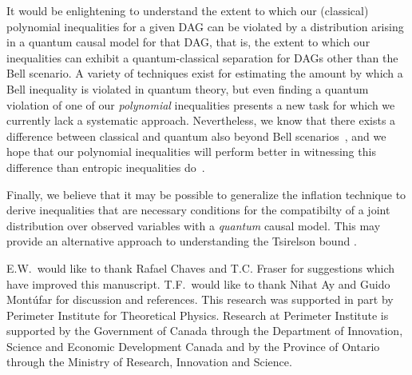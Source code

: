 {It would be enlightening to understand the extent to which our (classical) polynomial inequalities for a given DAG can be violated by a distribution arising in a quantum causal model for that DAG, that is, the extent to which our inequalities can exhibit  a quantum-classical separation for DAGs other than the Bell scenario.  A variety of techniques exist for estimating the amount by which a Bell inequality \cite{NPA2008Long,I3322NPA1} is violated in quantum theory, but even finding a quantum violation of one of our \emph{polynomial} inequalities presents a new task for which we currently lack a systematic approach. Nevertheless, we know that there exists a difference between classical and quantum also beyond Bell scenarios~\cite[Theorem~2.16]{fritz2012bell}, and we hope that our polynomial inequalities will perform better in witnessing this difference than entropic inequalities do~\cite{pusey2014gdag,Chaves2015infoquantum}.

Finally, we believe that it may be possible to generalize the inflation technique to derive inequalities that are necessary conditions for the compatibilty of a joint distribution over observed variables with a {\em quantum} causal model.  This may provide an alternative approach to understanding the Tsirelson bound \cite{Brunner2013Bell}.







\begin{acknowledgments}
E.W.~would like to thank Rafael Chaves and T.C. Fraser for suggestions which have improved this manuscript. T.F.~would like to thank Nihat Ay and Guido Mont\'ufar for discussion and references. This research was supported in part by Perimeter Institute for Theoretical Physics. Research at Perimeter Institute is supported by the Government of Canada through the Department of Innovation, Science and Economic Development Canada and by the Province of Ontario through the Ministry of Research, Innovation and Science.
\end{acknowledgments}


}
